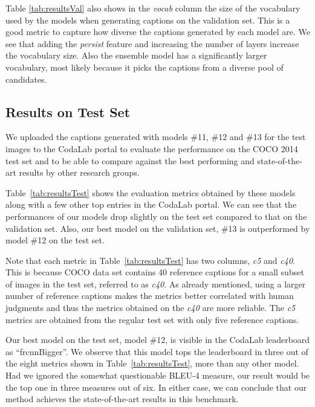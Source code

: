 Table \ref{tab:resultsVal} also shows in the \emph{vocab} column the size of the
vocabulary used by the models when generating captions on the validation set.
This is a good metric to capture how diverse the captions generated by each
model are. 
We see that adding the \emph{persist} feature and increasing the number of
layers increase the vocabulary size.
Also the ensemble model has a significantly larger vocabulary, most likely
because it picks the captions from a diverse pool of candidates.



\subsection{Results on Test Set}

We uploaded the captions generated with models \#11, \#12 and \#13 for the test
images to the CodaLab portal to evaluate the performance on the COCO 2014 test
set and to be able to compare against the best performing and state-of-the-art
results by other research groups.

Table~\ref{tab:resultsTest} shows the evaluation metrics obtained by these
models along with a few other top entries in the CodaLab portal. 
We can see that the performances of our models drop slightly on the test set
compared to that on the validation set. 
Also, our best model on the validation set, \#13 is outperformed by model \#12
on the test set.

Note that each metric in Table~\ref{tab:resultsTest} has two columns, \emph{c5}
and \emph{c40}. 
This is because COCO data set contains 40 reference captions for a small subset
of images in the test set, referred to as \emph{c40}. 
As already mentioned, using a larger number of reference captions makes the
metrics better correlated with human judgments and thus the metrics obtained on
the \emph{c40} are more reliable.
The \emph{c5} metrics are obtained from the regular test set with only five
reference captions. 

Our best model on the test set, model \#12, is visible in the CodaLab
leaderboard as ``frcnnBigger''.  
We observe that this model tops the leaderboard in three out of the eight
metrics shown in Table~\ref{tab:resultsTest}, more than any other model.
Had we ignored the somewhat questionable BLEU-4 measure, our result would be the
top one in three measures out of six.
In either case, we can conclude that our method achieves the state-of-the-art
results in this benchmark.


